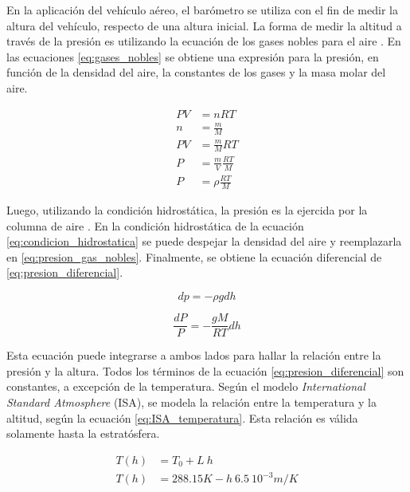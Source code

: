 En la aplicación del vehículo aéreo, el barómetro se utiliza con el fin de medir la altura del vehículo, respecto de una altura inicial. La forma de medir la altitud a través de la presión es utilizando la ecuación de los gases nobles para el aire \cite{cavcar2000international}. En las ecuaciones \eqref{eq:gases_nobles} se obtiene una expresión para la presión, en función de la densidad del aire, la constantes de los gases y la masa molar del aire.

\begin{subequations}
    \begin{align}
        P V &= n R T\\
        n &= \frac{m}{M}\\
        P V &= \frac{m}{M} R T\\
        P &= \frac{m}{V} \frac{R T}{M}\\
        P &= \rho \frac{R T}{M} \label{eq:presion_gas_nobles}
    \end{align}
    \label{eq:gases_nobles}
\end{subequations}

Luego, utilizando la condición hidrostática, la presión es la ejercida por la columna de aire \cite{cavcar2000international}. En la condición hidrostática de la ecuación \ref{eq:condicion_hidrostatica} se puede despejar la densidad del aire y reemplazarla en \eqref{eq:presion_gas_nobles}. Finalmente, se obtiene la ecuación diferencial de \eqref{eq:presion_diferencial}.

\begin{equation}
    dp = -\rho g dh
    \label{eq:condicion_hidrostatica}
\end{equation}

\begin{equation}
    \frac{dP}{P} = - \frac{g M}{R T} dh
    \label{eq:presion_diferencial}
\end{equation}

Esta ecuación puede integrarse a ambos lados para hallar la relación entre la presión y la altura. Todos los términos de la ecuación \eqref{eq:presion_diferencial} son constantes, a excepción de la temperatura. Según el modelo \textit{International Standard Atmosphere} (ISA), se modela la relación entre la temperatura y la altitud, según la ecuación \eqref{eq:ISA_temperatura}. Esta relación es válida solamente hasta la estratósfera.

\begin{subequations}
    \begin{align}
        T(h) &= T_0 + L \ h\\
        T(h) &= 288.15 K - h \ 6.5 \ 10^{-3} m/K
    \end{align}
    \label{eq:ISA_temperatura}
\end{subequations}

